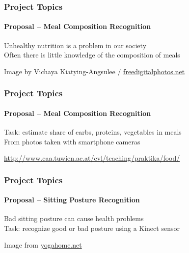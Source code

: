 \documentclass[xetex,professionalfont]{beamer}
\begin{document}
\begin{frame}
\frametitle{Project Topics}
\framesubtitle{Proposal -- Meal Composition Recognition}

Unhealthy nutrition is a problem in our society\\\medskip
Often there is little knowledge of the composition of meals

\bigskip
\begin{center}
	{\centering Image by Vichaya Kiatying-Angsulee / \url{freedigitalphotos.net}}
\end{center}

\end{frame}


\begin{frame}
\frametitle{Project Topics}
\framesubtitle{Proposal -- Meal Composition Recognition}

Task: estimate share of carbs, proteins, vegetables in meals\\\medskip
From photos taken with smartphone cameras

\medskip
\begin{center}
	\small\url{http://www.caa.tuwien.ac.at/cvl/teaching/praktika/food/}
\end{center}

\end{frame}


\begin{frame}
\frametitle{Project Topics}
\framesubtitle{Proposal -- Sitting Posture Recognition}

Bad sitting posture can cause health problems\\\medskip
Task: recognize good or bad posture using a Kinect sensor

\bigskip
\begin{center}
	{\centering Image from \url{yogahome.net}}
\end{center}

\end{frame}
\end{document}
